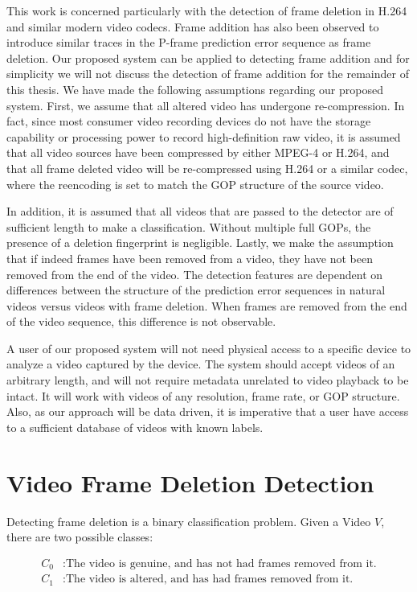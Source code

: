 This work is concerned particularly with the detection of frame deletion in H.264 and similar modern video codecs. Frame addition has also been observed to introduce similar traces in the P-frame prediction error sequence as frame deletion. Our proposed system can be applied to detecting frame addition and for simplicity we will not discuss the detection of frame addition for the remainder of this thesis. We have made the following assumptions regarding our proposed system. First, we assume that all altered video has undergone re-compression. In fact, since most consumer video recording devices do not have the storage capability or processing power to record high-definition raw video, it is assumed that all video sources have been compressed by either MPEG-4 or H.264, and that all frame deleted video will be re-compressed using H.264 or a similar codec, where the reencoding is set to match the GOP structure of the source video. 

In addition, it is assumed that all videos that are passed to the detector are of sufficient length to make a classification. Without multiple full GOPs, the presence of a deletion fingerprint is negligible. Lastly, we make the assumption that if indeed frames have been removed from a video, they have not been removed from the end of the video. The detection features are dependent on differences between the structure of the prediction error sequences in natural videos versus videos with frame deletion. When frames are removed from the end of the video sequence, this difference is not observable. 

A user of our proposed system will not need physical access to a specific device to analyze a video captured by the device. The system should accept videos of an arbitrary length, and will not require metadata unrelated to video playback to be intact. It will work with videos of any resolution, frame rate, or GOP structure. Also, as our approach will be data driven, it is imperative that a user have access to a sufficient database of videos with known labels.

\section{Video Frame Deletion Detection}

Detecting frame deletion is a binary classification problem. Given a Video $V$, there are two possible classes:

\begin{equation}
\begin{aligned}
  C_{0} &: \text{The video is genuine, and has not had frames removed from it.} \\
  C_{1} &: \text{The video is altered, and has had frames removed from it.}
\end{aligned}
\end{equation}

